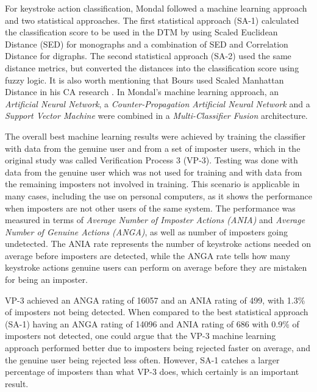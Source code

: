 For keystroke action classification, Mondal followed a machine learning approach and two statistical approaches.
The first statistical approach (SA-1) calculated the classification score to be used in the DTM by using Scaled Euclidean Distance (SED) for monographs and a combination of SED and Correlation Distance for digraphs. 
The second statistical approach (SA-2) used the same distance metrics, but converted the distances into the classification score using fuzzy logic.
It is also worth mentioning that Bours used Scaled Manhattan Distance in his CA research \cite{BOURS201236}.
In Mondal's \cite{mondal} machine learning approach, an \textit{Artificial Neural Network}, a \textit{Counter-Propagation Artificial Neural Network} and a \textit{Support Vector Machine} were combined in a \textit{Multi-Classifier Fusion} architecture. 

The overall best machine learning results were achieved by training the classifier with data from the genuine user and from a set of imposter users, which in the original study \cite{mondal} was called Verification Process 3 (VP-3).
Testing was done with data from the genuine user which was not used for training and with data from the remaining imposters not involved in training.
This scenario is applicable in many cases, including the use on personal computers, as it shows the performance when imposters are not other users of the same system.
The performance was measured in terms of \textit{Average Number of Imposter Actions (ANIA)} and \textit{Average Number of Genuine Actions (ANGA)}, as well as number of imposters going undetected.
The ANIA rate represents the number of keystroke actions needed on average before imposters are detected, while the ANGA rate tells how many keystroke actions genuine users can perform on average before they are mistaken for being an imposter.

VP-3 achieved an ANGA rating of 16057 and an ANIA rating of 499, with 1.3\% of imposters not being detected.
When compared to the best statistical approach (SA-1) having an ANGA rating of 14096 and ANIA rating of 686 with 0.9\% of imposters not detected, one could argue that the VP-3 machine learning approach performed better due to imposters being rejected faster on average, and the genuine user being rejected less often.
However, SA-1 catches a larger percentage of imposters than what VP-3 does, which certainly is an important result.

